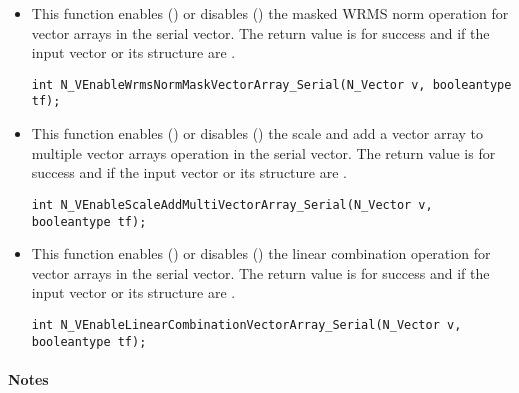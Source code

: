 \begin{itemize}
\item {}

This function enables () or disables () the masked WRMS
norm operation for vector arrays in the serial vector. The return value is
 for success and  if the input vector or its  structure are
.

\verb|int N_VEnableWrmsNormMaskVectorArray_Serial(N_Vector v, booleantype tf);|


\item {}

This function enables () or disables () the scale and
add a vector array to multiple vector arrays operation in the serial vector. The
return value is  for success and  if the input vector or its
 structure are .

\verb|int N_VEnableScaleAddMultiVectorArray_Serial(N_Vector v, booleantype tf);|


\item {}

This function enables () or disables () the linear
combination operation for vector arrays in the serial vector. The return value
is  for success and  if the input vector or its  structure
are .

\verb|int N_VEnableLinearCombinationVectorArray_Serial(N_Vector v, booleantype tf);|

\end{itemize}
\paragraph{\bf Notes}                                                      
           
